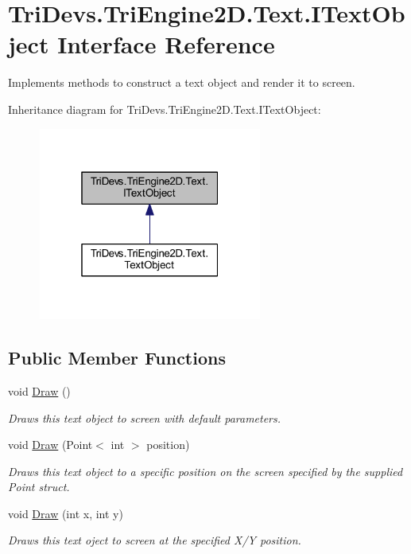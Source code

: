 \hypertarget{interface_tri_devs_1_1_tri_engine2_d_1_1_text_1_1_i_text_object}{\section{Tri\-Devs.\-Tri\-Engine2\-D.\-Text.\-I\-Text\-Object Interface Reference}
\label{interface_tri_devs_1_1_tri_engine2_d_1_1_text_1_1_i_text_object}
}


Implements methods to construct a text object and render it to screen.  




Inheritance diagram for Tri\-Devs.\-Tri\-Engine2\-D.\-Text.\-I\-Text\-Object\-:\nopagebreak
\begin{figure}[H]
\begin{center}
\leavevmode
\includegraphics[width=208pt]{interface_tri_devs_1_1_tri_engine2_d_1_1_text_1_1_i_text_object__inherit__graph}
\end{center}
\end{figure}
\subsection*{Public Member Functions}
\begin{DoxyCompactItemize}
\item 
void \hyperlink{interface_tri_devs_1_1_tri_engine2_d_1_1_text_1_1_i_text_object_a5a3793a417de1b06940dac3f16ad193a}{Draw} ()
\begin{DoxyCompactList}\small\item\em Draws this text object to screen with default parameters. \end{DoxyCompactList}\item 
void \hyperlink{interface_tri_devs_1_1_tri_engine2_d_1_1_text_1_1_i_text_object_afa5b95215db804ea89f6bd5a1ea6658d}{Draw} (Point$<$ int $>$ position)
\begin{DoxyCompactList}\small\item\em Draws this text object to a specific position on the screen specified by the supplied Point struct. \end{DoxyCompactList}\item 
void \hyperlink{interface_tri_devs_1_1_tri_engine2_d_1_1_text_1_1_i_text_object_a8f0606e90a8944c9ab8a49f2aac09876}{Draw} (int x, int y)
\begin{DoxyCompactList}\small\item\em Draws this text oject to screen at the specified X/\-Y position. \end{DoxyCompactList}\end{DoxyCompactItemize}
